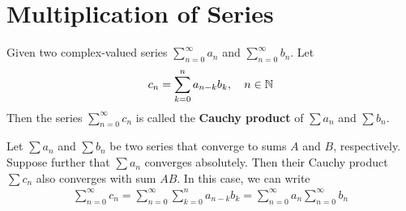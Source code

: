 \documentclass[thmcnt=section, 12pt]{my-elegantbook}
\begin{document}
\section{Multiplication of Series}

\begin{definition}
    Given two complex-valued series $\sum_{n=0}^\infty a_n$ and $\sum_{n=0}^\infty b_n$. Let 
    \begin{align*}
        c_n = \sum_{k=0}^{n} a_{n-k} b_k,
        \quad n \in \mathbb{N}
    \end{align*}
    Then the series $\sum_{n=0}^\infty c_n$ is called the \textbf{Cauchy product} of $\sum a_n$ and $\sum b_n$.
\end{definition}

\begin{theorem}[Mertens] \label{thm:67}
    Let $\sum a_n$ and $\sum b_n$ be two series that converge to sums $A$ and $B$, respectively. Suppose further that $\sum a_n$ converges absolutely. Then their Cauchy product $\sum c_n$ also converges with sum $AB$. In this case, we can write 
    \begin{align*}
        \sum_{n=0}^\infty c_n
        = \sum_{n=0}^\infty \sum_{k=0}^n a_{n-k} b_k
        = \sum_{n=0}^\infty a_n
        \sum_{n=0}^\infty b_n
    \end{align*}
\end{theorem}
\end{document}
